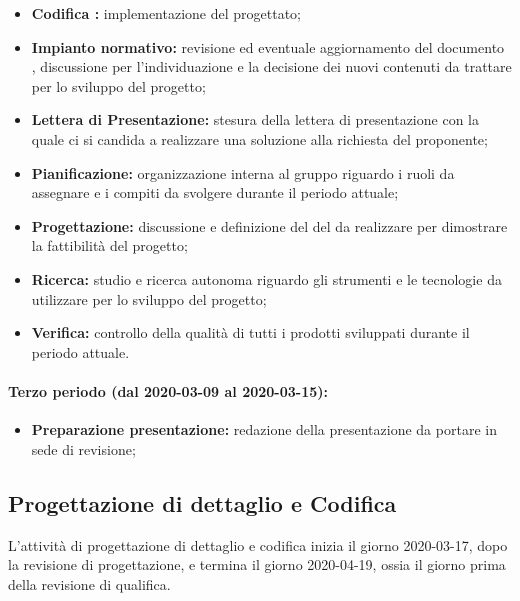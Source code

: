 					\begin{itemize}
						\item \textbf{Codifica :} implementazione del  progettato;
						\item \textbf{Impianto normativo:} revisione ed eventuale aggiornamento del documento , discussione per l'individuazione e la decisione dei nuovi contenuti da trattare per lo sviluppo del progetto;
						\item \textbf{Lettera di Presentazione:} stesura della lettera di presentazione con la quale ci si candida a realizzare una soluzione alla richiesta del proponente;
						\item \textbf{Pianificazione:} organizzazione interna al gruppo riguardo i ruoli da assegnare e i compiti da svolgere durante il periodo attuale;
						\item \textbf{Progettazione:} discussione e definizione del  del  da realizzare per dimostrare la fattibilità del progetto;
						\item \textbf{Ricerca:} studio e ricerca autonoma riguardo gli strumenti e le tecnologie da utilizzare per lo sviluppo del progetto;
						\item \textbf{Verifica:} controllo della qualità di tutti i prodotti sviluppati durante il periodo attuale.
					\end{itemize}
		
				\paragraph{Terzo periodo (dal 2020-03-09 al 2020-03-15):}
				
					\begin{itemize}
						\item \textbf{Preparazione presentazione:} redazione della presentazione da portare in sede di revisione;
					\end{itemize}

		\subsection{Progettazione di dettaglio e Codifica}
		
			L'attività di progettazione di dettaglio e codifica inizia il giorno 2020-03-17, dopo la revisione di progettazione, e termina il giorno 2020-04-19, ossia il giorno prima della revisione di qualifica.
			
